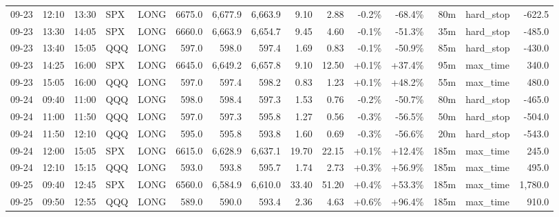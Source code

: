 \documentclass[11pt,a4paper,twoside]{article}
\begin{document}
\begin{landscape}
\begin{center}
\begin{longtable}{>{\color{txtmain}}l l l l l r r r r r r r r >{\color{txtmain}}l r}
09-23 & 12:10 & 13:30 & SPX & LONG & 6675.0 & 6,677.9 & 6,663.9 & 9.10 & 2.88 & \textcolor{lossred}{-0.2\%} & \textcolor{lossred}{-68.4\%} & 80m & hard\_stop & \textcolor{lossred}{-622.5} \\
09-23 & 13:30 & 14:05 & SPX & LONG & 6660.0 & 6,663.9 & 6,654.7 & 9.45 & 4.60 & \textcolor{lossred}{-0.1\%} & \textcolor{lossred}{-51.3\%} & 35m & hard\_stop & \textcolor{lossred}{-485.0} \\
09-23 & 13:40 & 15:05 & QQQ & LONG & 597.0 & 598.0 & 597.4 & 1.69 & 0.83 & \textcolor{lossred}{-0.1\%} & \textcolor{lossred}{-50.9\%} & 85m & hard\_stop & \textcolor{lossred}{-430.0} \\
09-23 & 14:25 & 16:00 & SPX & LONG & 6645.0 & 6,649.2 & 6,657.8 & 9.10 & 12.50 & \textcolor{wingreen}{+0.1\%} & \textcolor{wingreen}{+37.4\%} & 95m & max\_time & \textcolor{wingreen}{340.0} \\
09-23 & 15:05 & 16:00 & QQQ & LONG & 597.0 & 597.4 & 598.2 & 0.83 & 1.23 & \textcolor{wingreen}{+0.1\%} & \textcolor{wingreen}{+48.2\%} & 55m & max\_time & \textcolor{wingreen}{480.0} \\
09-24 & 09:40 & 11:00 & QQQ & LONG & 598.0 & 598.4 & 597.3 & 1.53 & 0.76 & \textcolor{lossred}{-0.2\%} & \textcolor{lossred}{-50.7\%} & 80m & hard\_stop & \textcolor{lossred}{-465.0} \\
09-24 & 11:00 & 11:50 & QQQ & LONG & 597.0 & 597.3 & 595.8 & 1.27 & 0.56 & \textcolor{lossred}{-0.3\%} & \textcolor{lossred}{-56.5\%} & 50m & hard\_stop & \textcolor{lossred}{-504.0} \\
09-24 & 11:50 & 12:10 & QQQ & LONG & 595.0 & 595.8 & 593.8 & 1.60 & 0.69 & \textcolor{lossred}{-0.3\%} & \textcolor{lossred}{-56.6\%} & 20m & hard\_stop & \textcolor{lossred}{-543.0} \\
09-24 & 12:00 & 15:05 & SPX & LONG & 6615.0 & 6,628.9 & 6,637.1 & 19.70 & 22.15 & \textcolor{wingreen}{+0.1\%} & \textcolor{wingreen}{+12.4\%} & 185m & max\_time & \textcolor{wingreen}{245.0} \\
09-24 & 12:10 & 15:15 & QQQ & LONG & 593.0 & 593.8 & 595.7 & 1.74 & 2.73 & \textcolor{wingreen}{+0.3\%} & \textcolor{wingreen}{+56.9\%} & 185m & max\_time & \textcolor{wingreen}{495.0} \\
09-25 & 09:40 & 12:45 & SPX & LONG & 6560.0 & 6,584.9 & 6,610.0 & 33.40 & 51.20 & \textcolor{wingreen}{+0.4\%} & \textcolor{wingreen}{+53.3\%} & 185m & max\_time & \textcolor{wingreen}{1,780.0} \\
09-25 & 09:50 & 12:55 & QQQ & LONG & 589.0 & 590.0 & 593.4 & 2.36 & 4.63 & \textcolor{wingreen}{+0.6\%} & \textcolor{wingreen}{+96.4\%} & 185m & max\_time & \textcolor{wingreen}{910.0} \\

\end{longtable}
\end{center}
\end{landscape}
\end{document}
